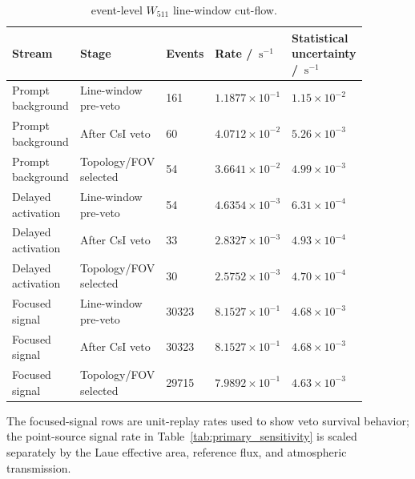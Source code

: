 \documentclass[pdflatex,sn-mathphys-num]{sn-jnl}
\newcommand{\cps}{\,\mathrm{s^{-1}}}
\newcommand{\wii}{W_{511}}
\newcommand{\added}[1]{{#1}}
\begin{document}
\begin{table}[t]
\centering
\caption{\added{event-level $\wii$ line-window cut-flow.}}
\label{tab:phase2_cutflow}
\footnotesize
{
\setlength{\tabcolsep}{3pt}
\begin{tabular}{p{0.20\linewidth}p{0.24\linewidth}p{0.08\linewidth}p{0.16\linewidth}p{0.20\linewidth}}
\toprule
Stream & Stage & Events & Rate / $\cps$ & Statistical uncertainty / $\cps$ \\
\midrule
Prompt background & Line-window pre-veto & 161 & $1.1877\times10^{-1}$ & $1.15\times10^{-2}$ \\
Prompt background & After CsI veto & 60 & $4.0712\times10^{-2}$ & $5.26\times10^{-3}$ \\
Prompt background & Topology/FOV selected & 54 & $3.6641\times10^{-2}$ & $4.99\times10^{-3}$ \\
Delayed activation & Line-window pre-veto & 54 & $4.6354\times10^{-3}$ & $6.31\times10^{-4}$ \\
Delayed activation & After CsI veto & 33 & $2.8327\times10^{-3}$ & $4.93\times10^{-4}$ \\
Delayed activation & Topology/FOV selected & 30 & $2.5752\times10^{-3}$ & $4.70\times10^{-4}$ \\
Focused signal & Line-window pre-veto & 30323 & $8.1527\times10^{-1}$ & $4.68\times10^{-3}$ \\
Focused signal & After CsI veto & 30323 & $8.1527\times10^{-1}$ & $4.68\times10^{-3}$ \\
Focused signal & Topology/FOV selected & 29715 & $7.9892\times10^{-1}$ & $4.63\times10^{-3}$ \\
\bottomrule
\end{tabular}
\par}
\vspace{0.5ex}
\begin{minipage}{0.94\linewidth}
\footnotesize
The focused-signal rows are unit-replay rates used to show veto survival
behavior; the point-source signal rate in Table~\ref{tab:primary_sensitivity}
is scaled separately by the Laue effective area, reference flux, and atmospheric
transmission.
\end{minipage}
\end{table}
\end{document}
